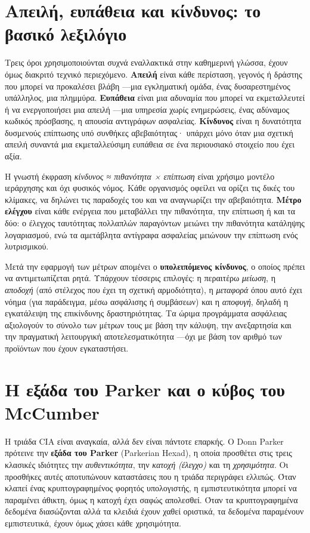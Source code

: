 \section{Απειλή, ευπάθεια και κίνδυνος: το βασικό λεξιλόγιο}\label{sec:1.5}
Τρεις όροι χρησιμοποιούνται συχνά εναλλακτικά στην καθημερινή γλώσσα, έχουν όμως διακριτό τεχνικό περιεχόμενο. \textbf{Απειλή} είναι κάθε περίσταση, γεγονός ή δράστης που μπορεί να προκαλέσει βλάβη —μια εγκληματική ομάδα, ένας δυσαρεστημένος υπάλληλος, μια πλημμύρα. \textbf{Ευπάθεια} είναι μια αδυναμία που μπορεί να εκμεταλλευτεί ή να ενεργοποιήσει μια απειλή —μια υπηρεσία χωρίς ενημερώσεις, ένας αδύναμος κωδικός πρόσβασης, η απουσία αντιγράφων ασφαλείας. \textbf{Κίνδυνος} είναι η δυνατότητα δυσμενούς επίπτωσης υπό συνθήκες αβεβαιότητας· υπάρχει μόνο όταν μια σχετική απειλή συναντά μια εκμεταλλεύσιμη ευπάθεια σε ένα περιουσιακό στοιχείο που έχει αξία.

Η γνωστή έκφραση \emph{κίνδυνος ≈ πιθανότητα × επίπτωση} είναι χρήσιμο μοντέλο ιεράρχησης και όχι φυσικός νόμος. Κάθε οργανισμός οφείλει να ορίζει τις δικές του κλίμακες, να δηλώνει τις παραδοχές του και να αναγνωρίζει την αβεβαιότητα. \textbf{Μέτρο ελέγχου} είναι κάθε ενέργεια που μεταβάλλει την πιθανότητα, την επίπτωση ή και τα δύο: ο έλεγχος ταυτότητας πολλαπλών παραγόντων μειώνει την πιθανότητα κατάληψης λογαριασμού, ενώ τα αμετάβλητα αντίγραφα ασφαλείας μειώνουν την επίπτωση ενός λυτρισμικού.

Μετά την εφαρμογή των μέτρων απομένει ο \textbf{υπολειπόμενος κίνδυνος}, ο οποίος πρέπει να αντιμετωπίζεται ρητά. Υπάρχουν τέσσερις επιλογές: η περαιτέρω \emph{μείωση}, η \emph{αποδοχή} (από στέλεχος που έχει τη σχετική αρμοδιότητα), η \emph{μεταφορά} όπου αυτό έχει νόημα (για παράδειγμα, μέσω ασφάλισης ή συμβάσεων) και η \emph{αποφυγή}, δηλαδή η εγκατάλειψη της επικίνδυνης δραστηριότητας. Τα ώριμα προγράμματα ασφάλειας αξιολογούν το σύνολο των μέτρων τους με βάση την κάλυψη, την ανεξαρτησία και την πραγματική λειτουργική αποτελεσματικότητα —όχι με βάση τον αριθμό των προϊόντων που έχουν εγκαταστήσει.

\section{Η εξάδα του Parker και ο κύβος του McCumber}\label{sec:1.6}
Η τριάδα CIA είναι αναγκαία, αλλά δεν είναι πάντοτε επαρκής. Ο Donn Parker πρότεινε την \textbf{εξάδα του Parker} (Parkerian Hexad), η οποία προσθέτει στις τρεις κλασικές ιδιότητες την \emph{αυθεντικότητα}, την \emph{κατοχή (έλεγχο)} και τη \emph{χρησιμότητα}. Οι προσθήκες αυτές αποτυπώνουν καταστάσεις που η τριάδα περιγράφει ελλιπώς. Όταν κλαπεί ένας κρυπτογραφημένος φορητός υπολογιστής, η εμπιστευτικότητα μπορεί να παραμένει άθικτη, όμως η κατοχή έχει σαφώς απολεσθεί. Όταν τα κρυπτογραφημένα δεδομένα διασώζονται αλλά τα κλειδιά έχουν χαθεί οριστικά, τα δεδομένα παραμένουν εμπιστευτικά, έχουν όμως χάσει κάθε χρησιμότητα.

